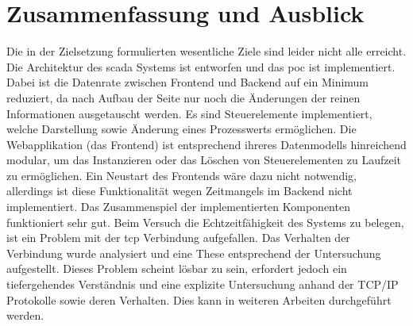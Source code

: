 \chapter{Zusammenfassung und Ausblick}\label{chapter:exit}
Die in der Zielsetzung formulierten wesentliche Ziele  sind leider nicht alle erreicht.
Die Architektur des \ac{scada} Systems ist entworfen und das \ac{poc} ist implementiert.
Dabei ist die Datenrate zwischen Frontend und Backend auf ein Minimum reduziert, 
da nach Aufbau der Seite nur noch die Änderungen der reinen Informationen ausgetauscht werden.
Es sind Steuerelemente implementiert, welche Darstellung sowie Änderung eines Prozesswerts ermöglichen.
Die Webapplikation (das Frontend) ist entsprechend ihreres Datenmodells hinreichend modular, um das Instanzieren oder das Löschen von Steuerelementen zu Laufzeit zu ermöglichen.
Ein Neustart des Frontends wäre dazu nicht notwendig, allerdings ist diese Funktionalität wegen Zeitmangels im Backend nicht implementiert.
Das Zusammenspiel der implementierten Komponenten funktioniert sehr gut.
Beim Versuch die Echtzeitfähigkeit des Systems zu belegen, ist ein Problem mit der \ac{tcp} Verbindung aufgefallen.
Das Verhalten der Verbindung wurde analysiert und eine These entsprechend der Untersuchung aufgestellt.
Dieses Problem scheint lösbar zu sein, erfordert jedoch ein tiefergehendes Verständnis und eine explizite Untersuchung anhand der TCP/IP Protokolle sowie deren Verhalten. 
Dies kann in weiteren Arbeiten durchgeführt werden.